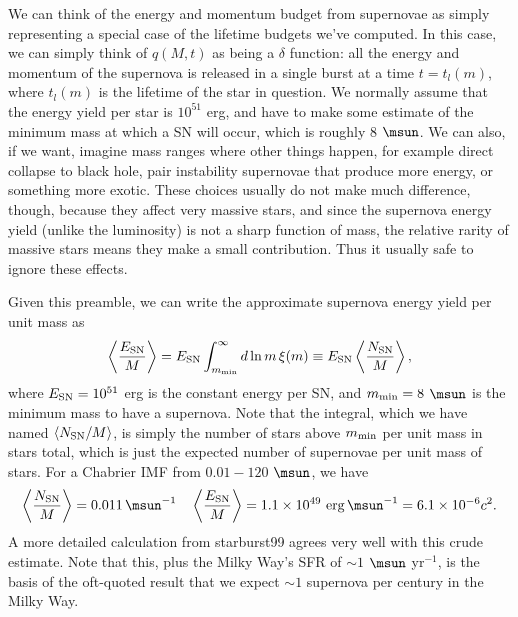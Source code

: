 We can think of the energy and momentum budget from supernovae as simply representing a special case of the lifetime budgets we've computed. In this case, we can simply think of $q(M,t)$ as being a $\delta$ function: all the energy and momentum of the supernova is released in a single burst at a time $t=t_l(m)$, where $t_l(m)$ is the lifetime of the star in question. We normally assume that the energy yield per star is $10^{51}$ erg, and have to make some estimate of the minimum mass at which a SN will occur, which is roughly 8 $\msun$. We can also, if we want, imagine mass ranges where other things happen, for example direct collapse to black hole, pair instability supernovae that produce more energy, or something more exotic. These choices usually do not make much difference, though, because they affect very massive stars, and since the supernova energy yield (unlike the luminosity) is not a sharp function of mass, the relative rarity of massive stars means they make a small contribution. Thus it usually safe to ignore these effects.

Given this preamble, we can write the approximate supernova energy yield per unit mass as
\begin{equation}
\left\langle \frac{E_{\rm SN}}{M}\right\rangle = E_{\rm SN} \int_{m_{\rm min}}^\infty d\ln m\, \xi(m) \equiv E_{\rm SN} \left\langle \frac{N_{\rm SN}}{M}\right\rangle,
\end{equation}
where $E_{\rm SN} = 10^{51}$ erg is the constant energy per SN, and $m_{\rm min} = 8$ $\msun$ is the minimum mass to have a supernova. Note that the integral, which we have named $\langle N_{\rm SN}/M\rangle$, is simply the number of stars above $m_{\rm min}$ per unit mass in stars total, which is just the expected number of supernovae per unit mass of stars. For a Chabrier IMF from $0.01-120$ $\msun$, we have
\begin{equation}
\left\langle \frac{N_{\rm SN}}{M}\right\rangle = 0.011\, \msun^{-1}
\quad
\left\langle \frac{E_{\rm SN}}{M}\right\rangle = 1.1\times 10^{49}\mbox{ erg}\,\msun^{-1}=6.1\times 10^{-6} c^2.
\end{equation}
A more detailed calculation from starburst99 agrees very well with this crude estimate. Note that this, plus the Milky Way's SFR of $\sim 1$ $\msun$ yr$^{-1}$, is the basis of the oft-quoted result that we expect $\sim 1$ supernova per century in the Milky Way.

